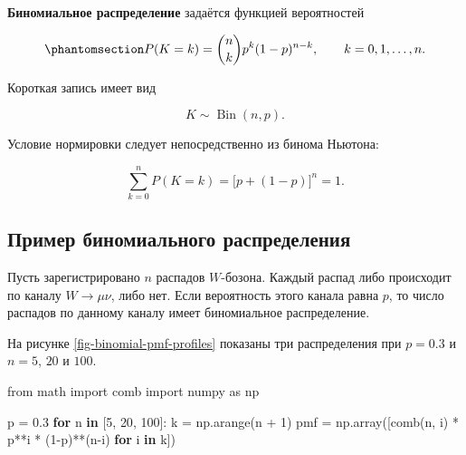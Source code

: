 \documentclass[
  russian,
  11pt,
  a4paper,
  open=any]{scrbook}
\newenvironment{Shaded}{\begin{snugshade}}{\end{snugshade}}
\newcommand{\ControlFlowTok}[1]{\textcolor[rgb]{0.00,0.23,0.31}{\textbf{#1}}}
\newcommand{\DecValTok}[1]{\textcolor[rgb]{0.68,0.00,0.00}{#1}}
\newcommand{\FloatTok}[1]{\textcolor[rgb]{0.68,0.00,0.00}{#1}}
\newcommand{\ImportTok}[1]{\textcolor[rgb]{0.00,0.46,0.62}{#1}}
\newcommand{\KeywordTok}[1]{\textcolor[rgb]{0.00,0.23,0.31}{\textbf{#1}}}
\newcommand{\NormalTok}[1]{\textcolor[rgb]{0.00,0.23,0.31}{#1}}
\newcommand{\OperatorTok}[1]{\textcolor[rgb]{0.37,0.37,0.37}{#1}}
\begin{document}
\begin{booknote}

\textbf{Биномиальное распределение} задаётся функцией вероятностей

\begin{equation}\protect\phantomsection\label{eq-binomial-pmf}{
P(K=k)=\binom{n}{k}p^k(1-p)^{n-k},
\qquad k=0,1,\ldots,n.
}\end{equation}

Короткая запись имеет вид

\[
K\sim\operatorname{Bin}(n,p).
\]

\end{booknote}

Условие нормировки следует непосредственно из бинома Ньютона:

\[
\sum_{k=0}^{n}P(K=k)
=\bigl[p+(1-p)\bigr]^n=1.
\]

\subsection{Пример биномиального
распределения}\label{ux43fux440ux438ux43cux435ux440-ux431ux438ux43dux43eux43cux438ux430ux43bux44cux43dux43eux433ux43e-ux440ux430ux441ux43fux440ux435ux434ux435ux43bux435ux43dux438ux44f}

Пусть зарегистрировано \(n\) распадов \(W\)-бозона. Каждый распад либо
происходит по каналу \(W\to\mu\nu\), либо нет. Если вероятность этого
канала равна \(p\), то число распадов по данному каналу имеет
биномиальное распределение.

На рисунке \ref{fig-binomial-pmf-profiles} показаны три распределения
при \(p=0.3\) и \(n=5\), \(20\) и \(100\).

\begin{Shaded}
\begin{Highlighting}[]
\ImportTok{from}\NormalTok{ math }\ImportTok{import}\NormalTok{ comb}
\ImportTok{import}\NormalTok{ numpy }\ImportTok{as}\NormalTok{ np}

\NormalTok{p }\OperatorTok{=} \FloatTok{0.3}
\ControlFlowTok{for}\NormalTok{ n }\KeywordTok{in}\NormalTok{ [}\DecValTok{5}\NormalTok{, }\DecValTok{20}\NormalTok{, }\DecValTok{100}\NormalTok{]:}
\NormalTok{    k }\OperatorTok{=}\NormalTok{ np.arange(n }\OperatorTok{+} \DecValTok{1}\NormalTok{)}
\NormalTok{    pmf }\OperatorTok{=}\NormalTok{ np.array([comb(n, i) }\OperatorTok{*}\NormalTok{ p}\OperatorTok{**}\NormalTok{i }\OperatorTok{*}\NormalTok{ (}\DecValTok{1}\OperatorTok{{-}}\NormalTok{p)}\OperatorTok{**}\NormalTok{(n}\OperatorTok{{-}}\NormalTok{i) }\ControlFlowTok{for}\NormalTok{ i }\KeywordTok{in}\NormalTok{ k])}
\end{Highlighting}
\end{Shaded}
\end{document}
